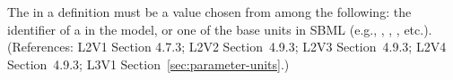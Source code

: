 The  in a \Parameter definition must be a value chosen from
among the following: the identifier of a \UnitDefinition in the model, or one of the
base units in SBML (e.g., , , ,
etc.).  (References: L2V1 Section 4.7.3; L2V2 Section~4.9.3; L2V3
Section~4.9.3; L2V4 Section~4.9.3; L3V1 Section~\ref{sec:parameter-units}.)
